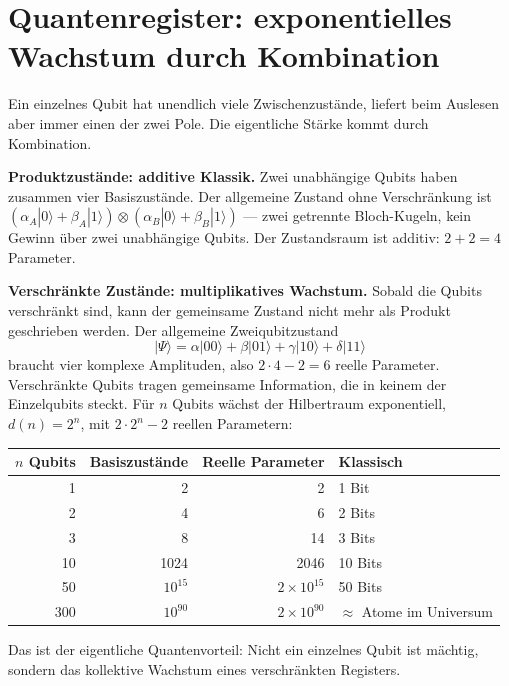 \section{Quantenregister: exponentielles Wachstum durch Kombination}

Ein einzelnes Qubit hat unendlich viele Zwischenzustände, liefert beim
Auslesen aber immer einen der zwei Pole. Die eigentliche Stärke kommt
durch Kombination.

\textbf{Produktzustände: additive Klassik.} Zwei unabhängige Qubits
haben zusammen vier Basiszustände. Der allgemeine Zustand ohne
Verschränkung ist $(\alpha_A|0\rangle+\beta_A|1\rangle)\otimes
(\alpha_B|0\rangle+\beta_B|1\rangle)$ --- zwei getrennte Bloch-Kugeln,
kein Gewinn über zwei unabhängige Qubits. Der Zustandsraum ist additiv:
$2+2 = 4$ Parameter.

\textbf{Verschränkte Zustände: multiplikatives Wachstum.} Sobald die
Qubits verschränkt sind, kann der gemeinsame Zustand nicht mehr als
Produkt geschrieben werden. Der allgemeine Zweiqubitzustand
\begin{equation}
  |\Psi\rangle = \alpha|00\rangle+\beta|01\rangle+\gamma|10\rangle+\delta|11\rangle
\end{equation}
braucht vier komplexe Amplituden, also $2\cdot4-2 = 6$ reelle Parameter.
Verschränkte Qubits tragen gemeinsame Information, die in keinem der
Einzelqubits steckt. Für $n$ Qubits wächst der Hilbertraum exponentiell,
$d(n) = 2^n$, mit $2\cdot2^n-2$ reellen Parametern:

\begin{center}
\small
\begin{tabular}{rrrl}
\toprule
$n$ Qubits & Basiszustände & Reelle Parameter & Klassisch \\
\midrule
1 & 2 & 2 & 1 Bit \\
2 & 4 & 6 & 2 Bits \\
3 & 8 & 14 & 3 Bits \\
10 & 1024 & 2046 & 10 Bits \\
50 & $10^{15}$ & $2\times10^{15}$ & 50 Bits \\
300 & $10^{90}$ & $2\times10^{90}$ & $\approx$ Atome im Universum \\
\bottomrule
\end{tabular}
\end{center}

Das ist der eigentliche Quantenvorteil: Nicht ein einzelnes Qubit ist
mächtig, sondern das kollektive Wachstum eines verschränkten Registers.

